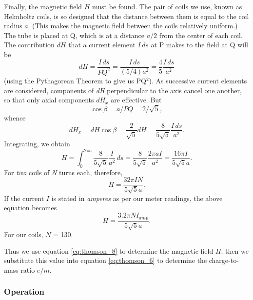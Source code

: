 Finally, the magnetic field $H$ must be found. The pair of coils we
use, known as Helmholtz coils, is so designed that the distance between
them is equal to the coil radius $a$. (This makes the magnetic field
between the coils relatively uniform.) The tube is placed at Q,
which is at a distance $a/2$ from the center of each coil. The
contribution $dH$ that a current element $I\,ds$ at P makes to
the field at Q will be
\begin{equation*}
dH = \frac{I\,ds}{PQ^2} = \frac{I\,ds}{(5/4)a^2} = \frac{4}{5}\frac{I\,ds}{a^2}
\end{equation*}
(using the Pythagorean Theorem to give us PQ$^2$). As
successive current elements are considered, components of \emph{dH}
per\-pen\-dic\-u\-lar to the axis cancel one another, so that only axial
components $dH_x$ are effective. But
\begin{equation*}
\cos{\beta} = a/PQ = 2/\sqrt{5},
\end{equation*}
whence
\begin{equation}
dH_x = dH \cos{\beta} = \frac{2}{\sqrt{5}}dH = \frac{8}{5\sqrt{5}}\frac{I\,ds}{a^2}.\label{eq:thomson_7}
\end{equation}
Integrating, we obtain
\begin{equation*}
H = \int_{0}^{2\pi{a}} \frac{8}{5\sqrt{5}}\frac{I}{a^2}\,ds = \frac{8}{5\sqrt{5}}\frac{2\pi aI}{a^2} = \frac{16\pi I}{5\sqrt{5}a}.
\end{equation*}
For \emph{two} coils of \emph{N} turns each, therefore,
\begin{equation*}
H = \frac{32\pi IN}{5\sqrt{5}a}.
\end{equation*}
If the current $I$ is stated in \emph{amperes} as per our meter
readings, the above equation becomes
\begin{equation}
H = \frac{3.2\pi NI_{amp}}{5\sqrt{5}a}.\label{eq:thomson_8}
\end{equation}
For our coils, $N$ = 130.

Thus we use equation \eqref{eq:thomson_8} to determine the magnetic field $H$; then
we substitute this value into equation \eqref{eq:thomson_6} to determine the
charge-to-mass ratio $e/m$.

\subsubsection*{Operation}

